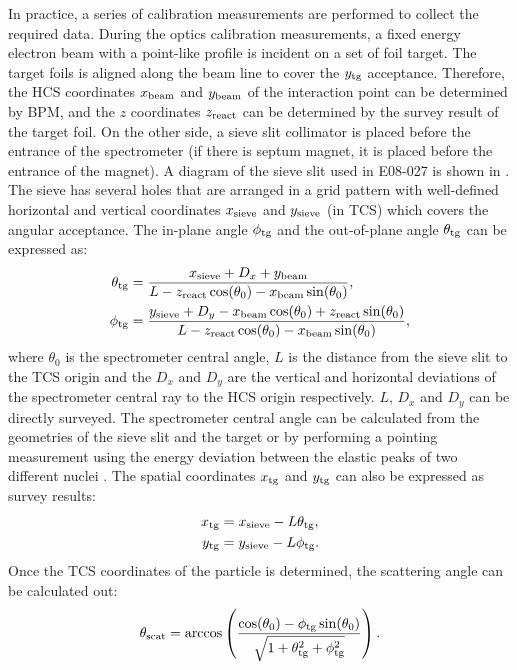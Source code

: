 In practice, a series of calibration measurements are performed to collect the required data. During the optics calibration measurements, a fixed energy electron beam with a point-like profile is incident on a set of foil target. The target foils is aligned along the beam line to cover the $y_{\mathrm{tg}}$ acceptance. Therefore, the HCS coordinates $x_{\mathrm{beam}}$ and $y_{\mathrm{beam}}$ of the interaction point can be determined by BPM, and the $z$ coordinates $z_{\mathrm{react}}$ can be determined by the survey result of the target foil. On the other side, a sieve slit collimator is placed before the entrance of the spectrometer (if there is septum magnet, it is placed before the entrance of the magnet). A diagram of the sieve slit used in E08-027 is shown in . The sieve has several holes that are arranged in a grid pattern with well-defined horizontal and vertical coordinates $x_{\mathrm{sieve}}$ and $y_{\mathrm{sieve}}$ (in TCS) which covers the angular acceptance. The in-plane angle $\phi_{\mathrm{tg}}$ and the out-of-plane angle $\theta_{\mathrm{tg}}$ can be expressed as:
\begin{align} \label{C6S2E5}
\theta_{\mathrm{tg}} & = \frac{x_{\mathrm{sieve}}+D_x+y_{\mathrm{beam}}}{L-z_{\mathrm{react}}\cos(\theta_0)-x_{\mathrm{beam}}\sin(\theta_0)}, \\ \label{C6S2E6}
\phi_{\mathrm{tg}} & = \frac{y_{\mathrm{sieve}}+D_y-x_{\mathrm{beam}}\cos(\theta_0)+z_{\mathrm{react}}\sin(\theta_0)}{L-z_{\mathrm{react}}\cos(\theta_0)-x_{\mathrm{beam}}\sin(\theta_0)},
\end{align}
where $\theta_0$ is the spectrometer central angle, $L$ is the distance from the sieve slit to the TCS origin and the $D_x$ and $D_y$ are the vertical and horizontal deviations of the spectrometer central ray to the HCS origin respectively. $L$, $D_x$ and $D_y$ can be directly surveyed. The spectrometer central angle can be calculated from the geometries of the sieve slit and the target or by performing a pointing measurement using the energy deviation between the elastic peaks of two different nuclei \cite{Liyanage2011}. The spatial coordinates $x_{\mathrm{tg}}$ and $y_{\mathrm{tg}}$ can also be expressed as survey results:
\begin{align} \label{C6S2E7}
x_{\mathrm{tg}} & = x_{\mathrm{sieve}}-L\theta_{\mathrm{tg}}, \\ \label{C6S2E8}
y_{\mathrm{tg}} & = y_{\mathrm{sieve}}-L\phi_{\mathrm{tg}}.
\end{align}
Once the TCS coordinates of the particle is determined, the scattering angle can be calculated out:
\begin{equation} \label{C6S2E9}
\theta_{\mathrm{scat}} = \arccos\left(\frac{\cos(\theta_0)-\phi_{\mathrm{tg}}\sin(\theta_0)}{\sqrt{1+\theta_{\mathrm{tg}}^2+\phi_{\mathrm{tg}}^2}}\right).
\end{equation}
